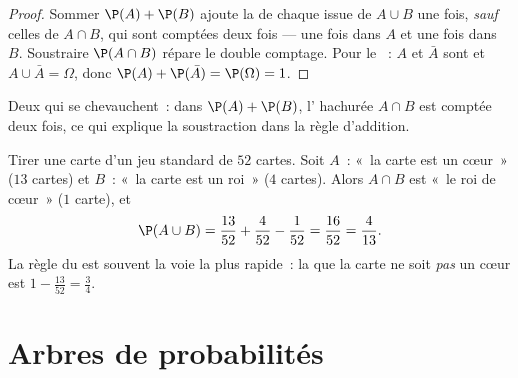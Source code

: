 \begin{proof}
Sommer $\P(A) + \P(B)$ ajoute la  de chaque issue de
$A \cup B$ une fois, \emph{sauf} celles de $A \cap B$, qui sont comptées
deux fois --- une fois dans $A$ et une fois dans $B$. Soustraire
$\P(A \cap B)$ répare le double comptage. Pour le ~: $A$ et
$\bar A$ sont  et $A \cup \bar A = \Omega$, donc
$\P(A) + \P(\bar A) = \P(\Omega) = 1$.
\end{proof}

\begin{omfigure}

{\small Deux  qui se chevauchent~: dans $\P(A) + \P(B)$,
l' hachurée $A \cap B$ est comptée deux fois, ce qui explique
la soustraction dans la règle d'addition.}
\end{omfigure}

\begin{example}\label{ex:g10:proba:cards}
Tirer une carte d'un jeu standard de $52$ cartes. Soit $A$~: «~la carte
est un cœur~» ($13$ cartes) et $B$~: «~la carte est un roi~» ($4$
cartes). Alors $A \cap B$ est «~le roi de cœur~» ($1$ carte), et
\[
\P(A \cup B) = \frac{13}{52} + \frac{4}{52} - \frac{1}{52} = \frac{16}{52}
= \frac{4}{13}.
\]
La règle du  est souvent la voie la plus rapide~: la
 que la carte ne soit \emph{pas} un cœur est
$1 - \frac{13}{52} = \frac34$.
\end{example}

\section{Arbres de probabilités}

